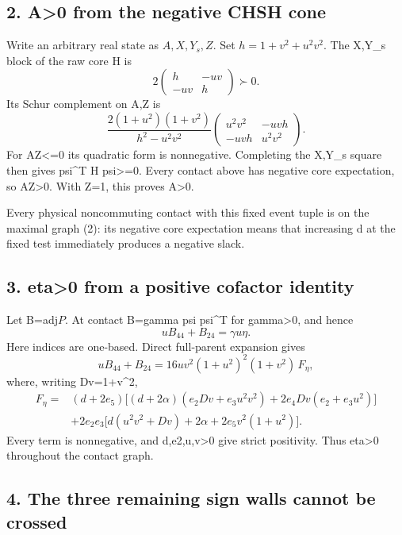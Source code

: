 \hypertarget{a0-from-the-negative-chsh-cone}{%
\subsection{2. A\textgreater0 from the negative CHSH cone}\label{pe31b9ef5ec43:a0-from-the-negative-chsh-cone}}

Write an arbitrary real state as \(A,X,Y_s,Z\). Set
\(h=1+v^2+u^2v^2\). The X,Y\_s block of the raw core H is
\[
2\begin{pmatrix}h&-uv\\-uv&h\end{pmatrix}\succ0.
\]
Its Schur complement on A,Z is
\[
\frac{2(1+u^2)(1+v^2)}{h^2-u^2v^2}
\begin{pmatrix}u^2v^2&-uvh\\-uvh&u^2v^2\end{pmatrix}.
\tag{3}
\]
For AZ\textless=0 its quadratic form is nonnegative. Completing the X,Y\_s square
then gives psi\^{}T H psi\textgreater=0. Every contact above has negative core
expectation, so AZ\textgreater0. With Z=1, this proves A\textgreater0.

Every physical noncommuting contact with this fixed event tuple is on the
maximal graph (2): its negative core expectation means that increasing d
at the fixed test immediately produces a negative slack.

\hypertarget{eta0-from-a-positive-cofactor-identity}{%
\subsection{3. eta\textgreater0 from a positive cofactor identity}\label{pe31b9ef5ec43:eta0-from-a-positive-cofactor-identity}}

Let B=adj\(P\). At contact B=gamma psi psi\^{}T for gamma\textgreater0, and hence
\[
u B_{44}+B_{24}=\gamma u\eta.
\]
Here indices are one-based. Direct full-parent expansion gives
\[
u B_{44}+B_{24}=16uv^2(1+u^2)^2(1+v^2)\,F_\eta,
\tag{4}
\]
where, writing Dv=1+v\^{}2,
\[
\begin{aligned}
F_\eta={}&(d+2e_5)\big[(d+2\alpha)(e_2Dv+e_3u^2v^2)
                 +2e_4Dv(e_2+e_3u^2)\big]\\
&+2e_2e_3\big[d(u^2v^2+Dv)+2\alpha+2e_5v^2(1+u^2)\big].
\end{aligned}
\tag{5}
\]
Every term is nonnegative, and d,e2,u,v\textgreater0 give strict positivity.
Thus eta\textgreater0 throughout the contact graph.

\hypertarget{the-three-remaining-sign-walls-cannot-be-crossed}{%
\subsection{4. The three remaining sign walls cannot be crossed}\label{pe31b9ef5ec43:the-three-remaining-sign-walls-cannot-be-crossed}}


